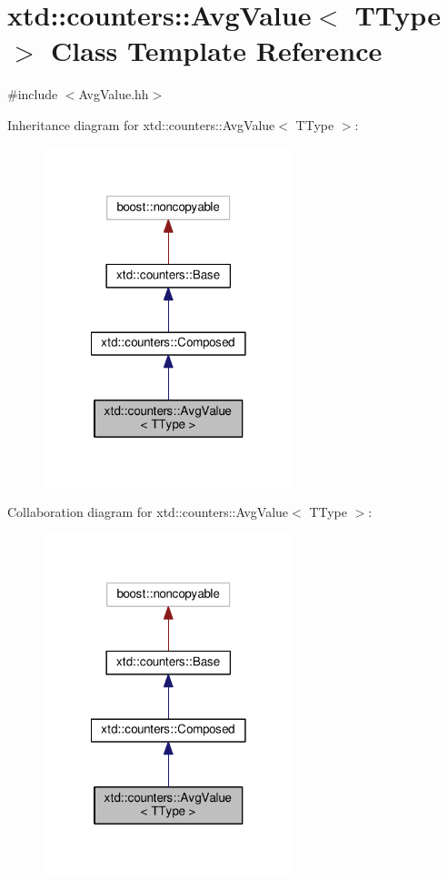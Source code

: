 \hypertarget{classxtd_1_1counters_1_1AvgValue}{\section{xtd\-:\-:counters\-:\-:Avg\-Value$<$ T\-Type $>$ Class Template Reference}
\label{classxtd_1_1counters_1_1AvgValue}
}


{\ttfamily \#include $<$Avg\-Value.\-hh$>$}



Inheritance diagram for xtd\-:\-:counters\-:\-:Avg\-Value$<$ T\-Type $>$\-:
\nopagebreak
\begin{figure}[H]
\begin{center}
\leavevmode
\includegraphics[width=206pt]{classxtd_1_1counters_1_1AvgValue__inherit__graph}
\end{center}
\end{figure}


Collaboration diagram for xtd\-:\-:counters\-:\-:Avg\-Value$<$ T\-Type $>$\-:
\nopagebreak
\begin{figure}[H]
\begin{center}
\leavevmode
\includegraphics[width=206pt]{classxtd_1_1counters_1_1AvgValue__coll__graph}
\end{center}
\end{figure}
